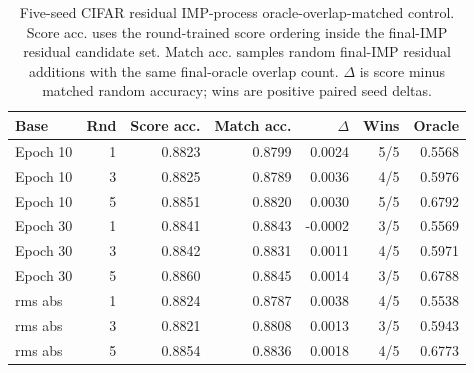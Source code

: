 \begin{table}[t]
\centering
\scriptsize
\setlength{\tabcolsep}{3pt}
\begin{tabular}{lrrrrrr}
\toprule
Base & Rnd & Score acc. & Match acc. & $\Delta$ & Wins & Oracle \\
\midrule
Epoch 10 & 1 & 0.8823 & 0.8799 & 0.0024 & 5/5 & 0.5568 \\
Epoch 10 & 3 & 0.8825 & 0.8789 & 0.0036 & 4/5 & 0.5976 \\
Epoch 10 & 5 & 0.8851 & 0.8820 & 0.0030 & 5/5 & 0.6792 \\
Epoch 30 & 1 & 0.8841 & 0.8843 & -0.0002 & 3/5 & 0.5569 \\
Epoch 30 & 3 & 0.8842 & 0.8831 & 0.0011 & 4/5 & 0.5971 \\
Epoch 30 & 5 & 0.8860 & 0.8845 & 0.0014 & 3/5 & 0.6788 \\
rms abs & 1 & 0.8824 & 0.8787 & 0.0038 & 4/5 & 0.5538 \\
rms abs & 3 & 0.8821 & 0.8808 & 0.0013 & 3/5 & 0.5943 \\
rms abs & 5 & 0.8854 & 0.8836 & 0.0018 & 4/5 & 0.6773 \\
\bottomrule
\end{tabular}
\caption{Five-seed CIFAR residual IMP-process oracle-overlap-matched control. Score acc. uses the round-trained score ordering inside the final-IMP residual candidate set. Match acc. samples random final-IMP residual additions with the same final-oracle overlap count. $\Delta$ is score minus matched random accuracy; wins are positive paired seed deltas.}
\label{tab:cifar-residual-imp-process-oracle-matched}
\end{table}

